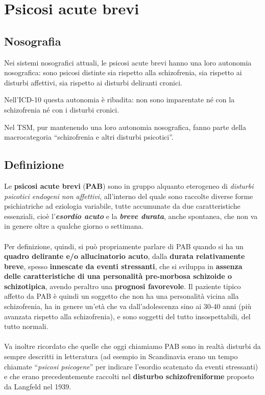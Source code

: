 \section{Psicosi acute brevi}

\subsection{Nosografia}

Nei sistemi nosografici attuali, le psicosi acute brevi hanno una loro
autonomia nosografica: sono psicosi distinte sia rispetto alla
schizofrenia, sia rispetto ai disturbi affettivi, sia rispetto ai
disturbi deliranti cronici.

Nell'ICD-10 questa autonomia è ribadita: non sono imparentate né con la
schizofrenia né con i disturbi cronici.

Nel TSM, pur mantenendo una loro autonomia nosografica, fanno parte
della macrocategoria ``schizofrenia e altri disturbi psicotici''.

\subsection{Definizione}

Le \textbf{psicosi acute brevi} (\textbf{PAB}) sono in gruppo alquanto
eterogeneo di \emph{disturbi psicotici endogeni non affettivi},
all'interno del quale sono raccolte diverse forme psichiatriche ad
eziologia variabile, tutte accumunate da due caratteristiche essenziali,
cioè l'\textbf{\emph{esordio acuto}} e la \textbf{\emph{breve durata}},
anche spontanea, che non va in genere oltre a qualche giorno o
settimana.
\\\\
Per definizione, quindi, si può propriamente parlare di PAB quando si ha
un \textbf{quadro delirante e/o allucinatorio acuto}, dalla
\textbf{durata relativamente breve}, spesso \textbf{innescate da eventi
stressanti}, che si sviluppa in \textbf{assenza delle caratteristiche di
una personalità pre-morbosa schizoide o schizotipica}, avendo peraltro
una \textbf{prognosi favorevole}. Il paziente tipico affetto da PAB è
quindi un soggetto che non ha una personalità vicina alla schizofrenia,
ha in genere un'età che va dall'adolescenza sino ai 30-40 anni (più
avanzata rispetto alla schizofrenia), e sono soggetti del tutto
insospettabili, del tutto normali.
\\\\
Va inoltre ricordato che quelle che oggi chiamiamo PAB sono in realtà
disturbi da sempre descritti in letteratura (ad esempio in Scandinavia
erano un tempo chiamate ``\emph{psicosi psicogene}'' per indicare
l'esordio scatenato da eventi stressanti) e che erano precedentemente
raccolti nel \textbf{disturbo schizofreniforme} proposto da Langfeld nel
1939.

